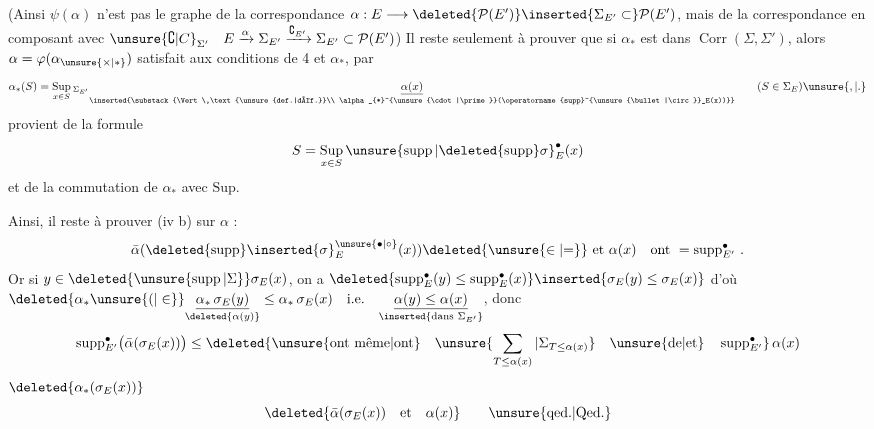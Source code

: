 (Ainsi $\psi(\alpha)$ n'est pas le graphe de la correspondance $\alpha:E\longrightarrow\deleted{\mathcal P(E')}\inserted{\Sigma_{E'}\subset}\mathcal P(E')$, mais de la correspondance  en composant avec $\unsure{\complement|C}_{\Sigma'}\quad E\xrightarrow{\alpha}\Sigma_{E'}\xrightarrow{\complement_{E'}}\Sigma_{E'}\subset\mathcal P(E')$)
Il reste seulement à prouver que si $\alpha_{*}$ est dans $\operatorname{Corr}(\Sigma,\Sigma')$, alors $\alpha=\varphi(\alpha_{\unsure{\times|*}})$ satisfait aux conditions de  4\unsure{,} et  $\alpha_{*}$, par
\[
 \alpha_{*}(S)=\mathop{\mathrm{Sup}}\limits_{x\in S}{}_{\Sigma_{E'}}
 \underset{\inserted{\substack{\Vert\,\text{\unsure{def.|déf.}}\\
 \alpha_{*}^{\unsure{\cdot|\prime}}(\operatorname{supp}^{\unsure{\bullet|\circ}}_E(x))}}}{\underline{\alpha(x)}}
 \qquad(S\in\Sigma_E)\unsure{,|.}
\]
 provient de la formule
\[
 S=\mathop{\mathrm{Sup}}\limits_{x\in S}{\unsure{\operatorname{supp}|\deleted{\operatorname{supp}}\sigma}}^{\bullet}_E(x)
\]
et de la commutation de $\alpha_{*}$ avec $\mathrm{Sup}$.

Ainsi, il reste à prouver (iv b) sur $\alpha$ :
\[
 \bar\alpha(\deleted{\operatorname{supp}}\inserted{\sigma}^{\unsure{\bullet|\circ}}_E(x))\deleted{\unsure{\in|{=}}}
 \text{ et }\alpha(x)\quad\text{ont }=\operatorname{supp}^{\bullet}_{E'}\,.
\]
Or si $y\in\deleted{\unsure{\operatorname{supp}|\Sigma}}\sigma_E(x)$, on a
$\deleted{\operatorname{supp}^{\bullet}_E(y)\leq\operatorname{supp}^{\bullet}_E(x)}\inserted{\sigma_E(y)\leq\sigma_E(x)}$
d'où $\deleted{\alpha_{*}\unsure{(|\in}}\underset{\deleted{\alpha(y)}}{\underline{\alpha_{*}\,\sigma_E(y)}}\leq\alpha_{*}\,\sigma_E(x)\quad\text{i.e.}\quad\underset{\inserted{\text{dans }\Sigma_{E'}}}{\underline{\alpha(y)\leq\alpha(x)}}$,
donc 
\[
 \operatorname{supp}^{\bullet}_{E'}\bigl(\bar\alpha(\sigma_E(x))\bigr)\leq
 \deleted{\text{\unsure{ont même|ont}}\quad
 \unsure{\sum_{T\leq\alpha(x)}|\Sigma_{T\leq\alpha(x)}}\quad
 \text{\unsure{de|et}}\quad\operatorname{supp}^{\bullet}_{E'}}\,\alpha(x)
\]
 $\deleted{\alpha_{*}(\sigma_E(x))}$
\[
 \deleted{\bar\alpha(\sigma_E(x))\quad\text{et}\quad\alpha(x)}
 \qquad\text{\unsure{qed.|Qed.}}
\]

